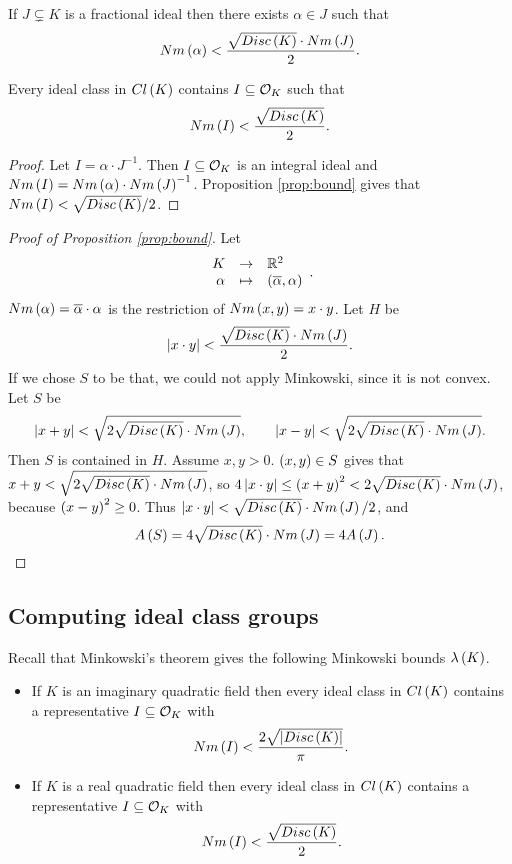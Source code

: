 \begin{proposition}
\label{prop:bound}
If $ J \subsetneq K $ is a fractional ideal then there exists $ \alpha \in J $ such that
$$ Nm\left( \alpha \right) < \dfrac{\sqrt{Disc\left( K \right)} \cdot Nm\left( J \right)}{2}. $$
\end{proposition}

\begin{corollary}
Every ideal class in $ Cl\left( K \right) $ contains $ I \subseteq \mathcal{O}_K $ such that
$$ Nm\left( I \right) < \dfrac{\sqrt{Disc\left( K \right)}}{2}. $$
\end{corollary}

\begin{proof}
Let $ I = \alpha \cdot J^{-1} $. Then $ I \subseteq \mathcal{O}_K $ is an integral ideal and $ Nm\left( I \right) = Nm\left( \alpha \right) \cdot Nm\left( J \right)^{-1} $. Proposition \ref{prop:bound} gives that $ Nm\left( I \right) < \sqrt{Disc\left( K \right)} / 2 $.
\end{proof}

\begin{proof}[Proof of Proposition \ref{prop:bound}]
Let
$$ \function{K}{\R^2}{\alpha}{\rb{\overline{\alpha}, \alpha}}. $$
$ Nm\left( \alpha \right) = \overline{\alpha} \cdot \alpha $ is the restriction of $ Nm\left( x, y \right) = x \cdot y $. Let $ H $ be
$$ \left\lvert x \cdot y \right\rvert < \dfrac{\sqrt{Disc\left( K \right)} \cdot Nm\left( J \right)}{2}. $$
If we chose $ S $ to be that, we could not apply Minkowski, since it is not convex. Let $ S $ be
$$ \left\lvert x + y \right\rvert < \sqrt{2\sqrt{Disc\left( K \right)} \cdot Nm\left( J \right)}, \qquad \left\lvert x - y \right\rvert < \sqrt{2\sqrt{Disc\left( K \right)} \cdot Nm\left( J \right)}. $$
Then $ S $ is contained in $ H $. Assume $ x, y > 0 $. $ \left( x, y \right) \in S $ gives that $ x + y < \sqrt{2\sqrt{Disc\left( K \right)} \cdot Nm\left( J \right)} $, so $ 4\left\lvert x \cdot y \right\rvert \le \left( x + y \right)^2 < 2\sqrt{Disc\left( K \right)} \cdot Nm\left( J \right) $, because $ \left( x - y \right)^2 \ge 0 $. Thus $ \left\lvert x \cdot y \right\rvert < \sqrt{Disc\left( K \right)} \cdot Nm\left( J \right) / 2 $, and
$$ A\left( S \right) = 4\sqrt{Disc\left( K \right)} \cdot Nm\left( J \right) = 4A\left( J \right). $$
\end{proof}

\pagebreak

\subsection{Computing ideal class groups}


Recall that Minkowski's theorem gives the following Minkowski bounds $ \lambda\left( K \right) $.
\begin{itemize}
\item If $ K $ is an imaginary quadratic field then every ideal class in $ Cl\left( K \right) $ contains a representative $ I \subseteq \mathcal{O}_K $ with
$$ Nm\left( I \right) < \dfrac{2\sqrt{\left\lvert Disc\left( K \right) \right\rvert}}{\pi}. $$
\item If $ K $ is a real quadratic field then every ideal class in $ Cl\left( K \right) $ contains a representative $ I \subseteq \mathcal{O}_K $ with
$$ Nm\left( I \right) < \dfrac{\sqrt{Disc\left( K \right)}}{2}. $$
\end{itemize}

